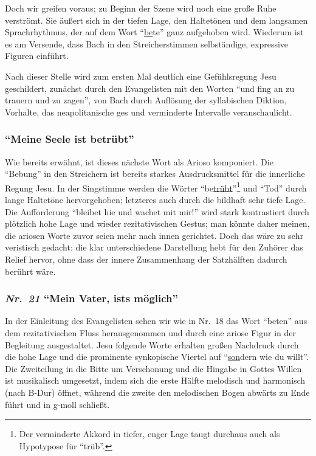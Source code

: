 \documentclass[a4paper,11pt,twoside]{scrartcl}
\newcommand{\Nr}[1]{\textmd{\textit{Nr.~#1}}}
\begin{document}
Doch wir greifen voraus; zu Beginn der Szene wird noch eine große Ruhe
verströmt.  Sie äußert sich in der tiefen Lage, den Haltetönen und dem
langsamen Sprachrhythmus, der auf dem Wort \enquote{\underline{be}te}
ganz aufgehoben wird.  Wiederum ist es am Versende, dass Bach in den
Streicherstimmen selbständige, expressive Figuren einführt.

Nach dieser Stelle wird zum ersten Mal deutlich eine Gefühlsregung
Jesu geschildert, zunächst durch den Evangelisten mit den Worten
\enquote{und fing an zu trauern und zu zagen}, von Bach durch
Auflösung der syllabischen Diktion, Vorhalte, das neapolitanische
ges und verminderte Intervalle veranschaulicht.

\subsubsection*{\enquote{Meine Seele ist betrübt}}
Wie bereits erwähnt, ist dieses nächste Wort als Arioso komponiert.  Die
\enquote{Bebung} in den Streichern ist bereits starkes Ausdrucksmittel
für die innerliche Regung Jesu.  In der Singstimme werden die Wörter
\enquote{be\underline{trübt}}\footnote{Der verminderte Akkord in tiefer,
enger Lage taugt durchaus auch als Hypotypose für \enquote{trüb}.} und
\enquote{Tod} durch lange Haltetöne hervorgehoben; letzteres auch durch
die bildhaft sehr tiefe Lage.  Die Aufforderung \enquote{bleibet hie
und wachet mit mir!} wird stark kontrastiert durch plötzlich hohe Lage
und wieder rezitativischen Gestus; man könnte daher meinen, die ariosen
Worte zuvor seien mehr nach innen gerichtet.  Doch das wäre zu sehr
veristisch gedacht: die klar unterschiedene Darstellung hebt für den
Zuhörer das Relief hervor, ohne dass der innere Zusammenhang der
Satzhälften dadurch berührt wäre.

\subsubsection*{\Nr{21} \enquote{Mein Vater, ists möglich}}
In der Einleitung des Evangelisten sehen wir wie in Nr.~18 das Wort
\enquote{beten} aus dem rezitativischen Fluss herausgenommen und durch
eine ariose Figur in der Begleitung ausgestaltet.  Jesu folgende Worte
erhalten großen Nachdruck durch die hohe Lage und die prominente
synkopische Viertel auf \enquote{\underline{son}dern wie du willt}.  Die
Zweiteilung in die Bitte um Verschonung und die Hingabe in Gottes Willen
ist musikalisch umgesetzt, indem sich die erste Hälfte melodisch und
harmonisch (nach B-Dur) öffnet, während die zweite den melodischen
Bogen abwärts zu Ende führt und in g-moll schließt.
\end{document}

